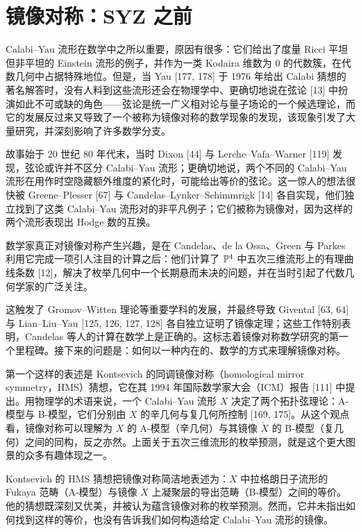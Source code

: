 \section{镜像对称：SYZ 之前}
Calabi--Yau 流形在数学中之所以重要，原因有很多：它们给出了度量 Ricci 平坦但非平坦的 Einstein 流形的例子，并作为一类 Kodaira 维数为 0 的代数簇，在代数几何中占据特殊地位。但是，当 Yau [177, 178] 于 1976 年给出 Calabi 猜想的著名解答时，没有人料到这些流形还会在物理学中、更确切地说在弦论 [13] 中扮演如此不可或缺的角色------弦论是统一广义相对论与量子场论的一个候选理论，而它的发展反过来又导致了一个被称为镜像对称的数学现象的发现，该现象引发了大量研究，并深刻影响了许多数学分支。

故事始于 20 世纪 80 年代末，当时 Dixon [44] 与 Lerche--Vafa--Warner [119] 发现，弦论或许并不区分 Calabi--Yau 流形；更确切地说，两个不同的 Calabi--Yau 流形在用作时空隐藏额外维度的紧化时，可能给出等价的弦论。这一惊人的想法很快被 Greene--Plesser [67] 与 Candelas--Lynker--Schimmrigk [14] 各自实现，他们独立找到了这类 Calabi--Yau 流形对的非平凡例子；它们被称为镜像对，因为这样的两个流形表现出 Hodge 数的互换。

数学家真正对镜像对称产生兴趣，是在 Candelas、de la Ossa、Green 与 Parkes 利用它完成一项引人注目的计算之后：他们计算了 $\mathbb{P}^4$ 中五次三维流形上的有理曲线条数 [12]，解决了枚举几何中一个长期悬而未决的问题，并在当时引起了代数几何学家的广泛关注。

这触发了 Gromov--Witten 理论等重要学科的发展，并最终导致 Givental [63, 64] 与 Lian--Liu--Yau [125, 126, 127, 128] 各自独立证明了镜像定理；这些工作特别表明，Candelas 等人的计算在数学上是正确的。这标志着镜像对称数学研究的第一个里程碑。接下来的问题是：如何以一种内在的、数学的方式来理解镜像对称。

第一个这样的表述是 Kontsevich 的同调镜像对称（homological mirror symmetry，HMS）猜想，它在其 1994 年国际数学家大会（ICM）报告 [111] 中提出。用物理学的术语来说，一个 Calabi--Yau 流形 $X$ 决定了两个拓扑弦理论：A-模型与 B-模型，它们分别由 $X$ 的辛几何与复几何所控制 [169, 175]。从这个观点看，镜像对称可以理解为 $X$ 的 A-模型（辛几何）与其镜像 $\check X$ 的 B-模型（复几何）之间的同构，反之亦然。上面关于五次三维流形的枚举预测，就是这个更大图景的众多有趣体现之一。

Kontsevich 的 HMS 猜想把镜像对称简洁地表述为：$X$ 中拉格朗日子流形的 Fukaya 范畴（A-模型）与镜像 $\check X$ 上凝聚层的导出范畴（B-模型）之间的等价。他的猜想既深刻又优美，并被认为蕴含镜像对称的枚举预测。然而，它并未指出如何找到这样的等价，也没有告诉我们如何构造给定 Calabi--Yau 流形的镜像。

